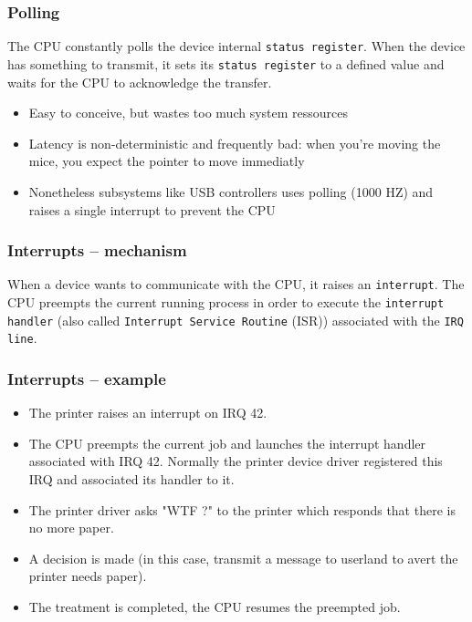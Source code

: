 \documentclass{beamer}
\begin{document}
\begin{frame}
  \frametitle{Polling}

  The CPU constantly polls the device internal \texttt{status register}. When the device has something to transmit, it sets its \texttt{status register} to a defined value and waits for the CPU to acknowledge the transfer.\\
  \begin{itemize}
  \item
    Easy to conceive, but wastes too much system ressources
  \item
    Latency is non-deterministic and frequently bad: when you're moving the mice, you expect the pointer to move immediatly
  \item
    Nonetheless subsystems like USB controllers uses polling (1000 HZ) and raises a single interrupt to prevent the CPU
  \end{itemize}
\end{frame}

\begin{frame}
  \frametitle{Interrupts -- mechanism}

  When a device wants to communicate with the CPU, it raises an \texttt{interrupt}. The CPU preempts the current running process in order to execute the \texttt{interrupt handler} (also called \texttt{Interrupt Service Routine} (ISR)) associated with the \texttt{IRQ line}.\\
\end{frame}

\begin{frame}
  \frametitle{Interrupts -- example}

  \begin{itemize}
  \item<1->
    The printer raises an interrupt on IRQ 42.
  \item<2->
    The CPU preempts the current job and launches the interrupt handler associated with IRQ 42. Normally the printer device driver registered this IRQ and associated its handler to it.
  \item<3->
    The printer driver asks "WTF ?" to the printer which responds that there is no more paper.
  \item<4->
    A decision is made (in this case, transmit a message to userland to avert the printer needs paper).
  \item<5->
    The treatment is completed, the CPU resumes the preempted job.
  \end{itemize}
\end{frame}
\end{document}
